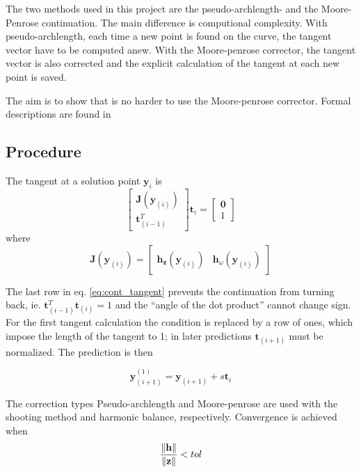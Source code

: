 The two methods used in this project are the pseudo-archlength- and
the Moore-Penrose continuation. The main difference is computional complexity.
With pseudo-archlength, each time a new point is found on the curve, the tangent
vector have to be computed anew. With the Moore-penrose corrector, the tangent
vector is also corrected and the explicit calculation of the tangent at each new
point is saved.

The aim is to show that is no harder to use the Moore-penrose corrector. Formal
descriptions are found in~\autocite{dhooge2003a}

\subsection{Procedure}
\label{sec:cont_procedure}

The tangent at a solution point $\bm y_{i}$ is
\begin{equation}
  \label{eq:cont_tangent}
  \begin{bmatrix}
    \bm J(\bm y_{(i)}) \\ \bm t^T_{(i-1)}
  \end{bmatrix}
  \bm t_{i}
  =
  \begin{bmatrix}
    \bm 0 \\ 1
  \end{bmatrix}
\end{equation}
where
\begin{equation}
  \label{eq:cont_J}
  \bm J(\bm y_{(i)}) =
  \begin{bmatrix}
    \bm h_{\bm z}(\bm y_{(i)}) & \bm h_{\omega}(\bm y_{(i)})
  \end{bmatrix}
\end{equation}

The last row in eq. \eqref{eq:cont_tangent} prevents the continuation from
turning back, ie. $\bm t^T_{(i-1)} \bm t_{(i)}=1$ and the ``angle of the dot
product'' cannot change sign. For the first tangent calculation the condition is
replaced by a row of ones, which impose the length of the tangent to 1; in later
predictions $\bm t_{(i+1)}$ must be normalized. The prediction is then

\begin{equation}
  \label{eq:cont_pred}
  \bm y^{(1)}_{(i+1)} = \bm y_{(i+1)} + s \bm t_i
\end{equation}

The correction types Pseudo-archlength and Moore-penrose are used with the
shooting method and harmonic balance, respectively. Convergence is achieved when
\begin{equation}
  \label{eq:cont_convergence}
  \frac{\norm{\bm h}}{\norm{\bm z}} < tol
\end{equation}

